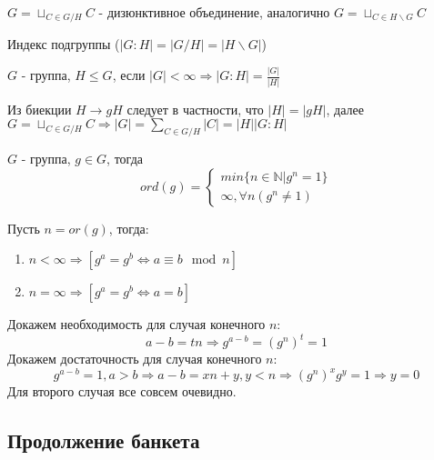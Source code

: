 $G = \sqcup_{C \in G / H} C$ - дизюнктивное объединение, аналогично
$G = \sqcup_{C \in H \backslash G} C$

\begin{Def}
Индекс подгруппы ($\left|G : H \right| = \left| G / H \right| = \left| H \backslash G \right|$)
\end{Def}

\begin{Th}
\label{math::lagrange}
$G$ - группа, $H \le G$, если $\left|G\right| < \infty \Rightarrow \left|G:H\right| = \frac{\left|G\right|}{\left|H\right|}$
\end{Th}

\begin{Proof}
Из биекции $H \rightarrow gH$ следует в частности, что $\left|H\right| = \left|gH\right|$, далее $G = \sqcup_{C \in G / H} C \Rightarrow \left|G\right| = \sum_{C \in G / H} \left|C\right| = \left|H\right| \left|G:H\right|$
\end{Proof}

\begin{Def}
$G$ - группа, $g \in G$, тогда 
\[
	ord \left(g\right) =
	\begin{cases}
		min \{n \in \mathbb{N} | g^{n} = 1 \} \\
		\infty, \forall n \left(g^n \not= 1\right)
	\end{cases}
\]
\end{Def}

\begin{Th}
Пусть $n = or \left( g \right)$, тогда:
\begin{enumerate}
\item $n < \infty \Rightarrow \left[g^a = g^b \Leftrightarrow a \equiv b \mod{n}\right]$

\item $n = \infty \Rightarrow \left[g^a = g^b \Leftrightarrow a = b\right]$
\end{enumerate}
\end{Th}

\begin{Proof}
Докажем необходимость для случая конечного $n$:
\[
	a-b = tn \Rightarrow g^{a-b} = {\left(g^n\right)}^t = 1
\]
Докажем достаточность для случая конечного $n$:
\[
	g^{a-b} = 1, a > b \Rightarrow a-b = xn+y, y < n \Rightarrow {\left(g^n\right)}^x g^y = 1 \Rightarrow y = 0
\]
Для второго случая все совсем очевидно.
\end{Proof}

\subsection{Продолжение банкета}

